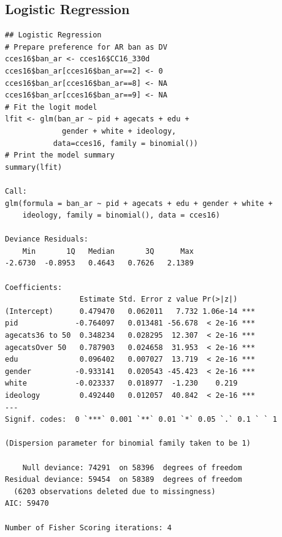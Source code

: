 \documentclass[12pt, letterpaper,notitlepage]{article}
\begin{document}
\subsection{Logistic Regression}
\begin{lstlisting}
## Logistic Regression
# Prepare preference for AR ban as DV
cces16$ban_ar <- cces16$CC16_330d
cces16$ban_ar[cces16$ban_ar==2] <- 0
cces16$ban_ar[cces16$ban_ar==8] <- NA
cces16$ban_ar[cces16$ban_ar==9] <- NA
# Fit the logit model
lfit <- glm(ban_ar ~ pid + agecats + edu + 
             gender + white + ideology,
           data=cces16, family = binomial())
# Print the model summary
summary(lfit)

Call:
glm(formula = ban_ar ~ pid + agecats + edu + gender + white + 
    ideology, family = binomial(), data = cces16)

Deviance Residuals: 
    Min       1Q   Median       3Q      Max  
-2.6730  -0.8953   0.4643   0.7626   2.1389  

Coefficients:
                 Estimate Std. Error z value Pr(>|z|)    
(Intercept)      0.479470   0.062011   7.732 1.06e-14 ***
pid             -0.764097   0.013481 -56.678  < 2e-16 ***
agecats36 to 50  0.348234   0.028295  12.307  < 2e-16 ***
agecatsOver 50   0.787903   0.024658  31.953  < 2e-16 ***
edu              0.096402   0.007027  13.719  < 2e-16 ***
gender          -0.933141   0.020543 -45.423  < 2e-16 ***
white           -0.023337   0.018977  -1.230    0.219    
ideology         0.492440   0.012057  40.842  < 2e-16 ***
---
Signif. codes:  0 `***` 0.001 `**` 0.01 `*` 0.05 `.` 0.1 ` ` 1

(Dispersion parameter for binomial family taken to be 1)

    Null deviance: 74291  on 58396  degrees of freedom
Residual deviance: 59454  on 58389  degrees of freedom
  (6203 observations deleted due to missingness)
AIC: 59470

Number of Fisher Scoring iterations: 4
\end{lstlisting}

\newpage
\end{document}
